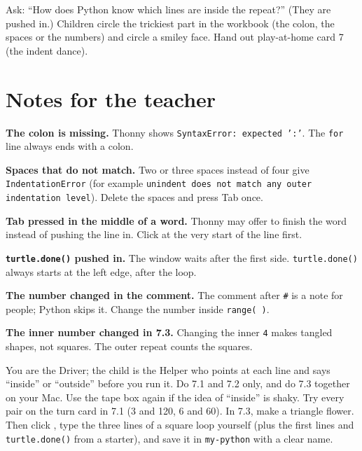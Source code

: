 \begin{reflection}
Ask: \enquote{How does Python know which lines are inside the repeat?} (They are pushed in.) Children circle the trickiest part in the workbook (the colon, the spaces or the numbers) and circle a smiley face. Hand out play-at-home card 7 (the indent dance).
\end{reflection}

\section{Notes for the teacher}
\begin{commonmistakes}
  \item \textbf{The colon is missing.} Thonny shows \texttt{SyntaxError: expected ':'}. The \texttt{for} line always ends with a colon.
  \item \textbf{Spaces that do not match.} Two or three spaces instead of four give \texttt{IndentationError} (for example \texttt{unindent does not match any outer indentation level}). Delete the spaces and press Tab once.
  \item \textbf{Tab pressed in the middle of a word.} Thonny may offer to finish the word instead of pushing the line in. Click at the very start of the line first.
  \item \textbf{\texttt{turtle.done()} pushed in.} The window waits after the first side. \texttt{turtle.done()} always starts at the left edge, after the loop.
  \item \textbf{The number changed in the comment.} The comment after \texttt{\#} is a note for people; Python skips it. Change the number inside \texttt{range( )}.
  \item \textbf{The inner number changed in 7.3.} Changing the inner \texttt{4} makes tangled shapes, not squares. The outer repeat counts the squares.
\end{commonmistakes}

\begin{differentiation}
\supportpath You are the Driver; the child is the Helper who points at each line and says \enquote{inside} or \enquote{outside} before you run it. Do 7.1 and 7.2 only, and do 7.3 together on your Mac. Use the tape box again if the idea of \enquote{inside} is shaky.
\extensionpath Try every pair on the turn card in 7.1 (3 and 120, 6 and 60). In 7.3, make a triangle flower. Then click , type the three lines of a square loop yourself (plus the first lines and \texttt{turtle.done()} from a starter), and save it in \texttt{my-python} with a clear name.
\end{differentiation}

